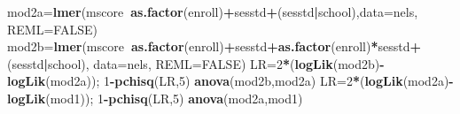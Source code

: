 \documentclass[ignorenonframetext,]{beamer}
\newenvironment{Shaded}{\begin{snugshade}}{\end{snugshade}}
\newcommand{\KeywordTok}[1]{\textcolor[rgb]{0.13,0.29,0.53}{\textbf{#1}}}
\newcommand{\DataTypeTok}[1]{\textcolor[rgb]{0.13,0.29,0.53}{#1}}
\newcommand{\DecValTok}[1]{\textcolor[rgb]{0.00,0.00,0.81}{#1}}
\newcommand{\OtherTok}[1]{\textcolor[rgb]{0.56,0.35,0.01}{#1}}
\newcommand{\OperatorTok}[1]{\textcolor[rgb]{0.81,0.36,0.00}{\textbf{#1}}}
\newcommand{\NormalTok}[1]{#1}
\begin{document}
\begin{frame}[fragile]{}

\begin{Shaded}
\begin{Highlighting}[]
\NormalTok{mod2a=}\KeywordTok{lmer}\NormalTok{(mscore}\OperatorTok{~}\KeywordTok{as.factor}\NormalTok{(enroll)}\OperatorTok{+}\NormalTok{sesstd}\OperatorTok{+}\NormalTok{(sesstd}\OperatorTok{|}\NormalTok{school),}\DataTypeTok{data=}\NormalTok{nels, }\DataTypeTok{REML=}\OtherTok{FALSE}\NormalTok{)}
\NormalTok{mod2b=}\KeywordTok{lmer}\NormalTok{(mscore}\OperatorTok{~}\KeywordTok{as.factor}\NormalTok{(enroll)}\OperatorTok{+}\NormalTok{sesstd}\OperatorTok{+}\KeywordTok{as.factor}\NormalTok{(enroll)}\OperatorTok{*}\NormalTok{sesstd}\OperatorTok{+}\NormalTok{(sesstd}\OperatorTok{|}\NormalTok{school),}
           \DataTypeTok{data=}\NormalTok{nels, }\DataTypeTok{REML=}\OtherTok{FALSE}\NormalTok{)}
\NormalTok{LR=}\DecValTok{2}\OperatorTok{*}\NormalTok{(}\KeywordTok{logLik}\NormalTok{(mod2b)}\OperatorTok{-}\KeywordTok{logLik}\NormalTok{(mod2a)); }\DecValTok{1}\OperatorTok{-}\KeywordTok{pchisq}\NormalTok{(LR,}\DecValTok{5}\NormalTok{)}
\KeywordTok{anova}\NormalTok{(mod2b,mod2a)}
\NormalTok{LR=}\DecValTok{2}\OperatorTok{*}\NormalTok{(}\KeywordTok{logLik}\NormalTok{(mod2a)}\OperatorTok{-}\KeywordTok{logLik}\NormalTok{(mod1)); }\DecValTok{1}\OperatorTok{-}\KeywordTok{pchisq}\NormalTok{(LR,}\DecValTok{5}\NormalTok{)}
\KeywordTok{anova}\NormalTok{(mod2a,mod1)}
\end{Highlighting}
\end{Shaded}

\end{frame}
\end{document}
